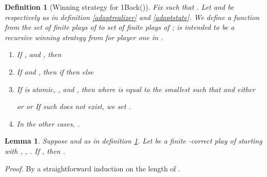\documentclass[copyright,creativecommons]{eptcs}
\newtheorem{lemma}{Lemma}
\newtheorem{definition}{Definition}
\begin{document}
\begin{definition}[Winning strategy for 1Back()]\label{definition-winningstrategy}
Fix  such that . Let  and  be respectively as in definition \ref{adaptrealizer} and \ref{adaptstate}. We define a function  from the set of finite plays of
 to set of finite plays of ;  is intended
to be a recursive winning strategy from  for player one in .
 \begin{enumerate} 
 \item If ,
 and ,
then 

 \item If  and ,
then if  then  else 

 \item If  is atomic, ,  and , then  where  is equal to the smallest
 such that  and either
 
or    
or  If such  does not exist, we set .
\item
In the other cases, .
\end{enumerate}

\end{definition}

 \begin{lemma} \label{preservationlemma}
 \label{lemma-Completenessof1Backtracking}Suppose  and  as in definition \ref{definition-winningstrategy}. Let  be a finite
-correct play of  starting with , , . If
, then . \end{lemma}
\textit{Proof.} By a straightforward induction on the length of
.
\end{document}
